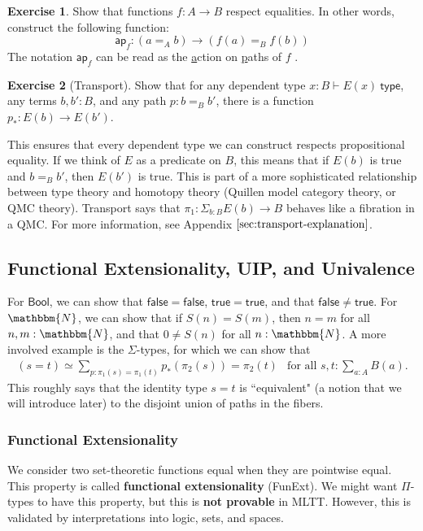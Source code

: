 \documentclass{amsart}
\theoremstyle{definition}
\newtheorem{ex}{Exercise}[section]
\newcommand{\N}{\mathbbm{N}}
\newcommand{\type}{\ensuremath{\mathsf{~type}}}
\newcommand{\Bool}{\ensuremath{\mathsf{Bool}}}
\newcommand{\True}{\ensuremath{\mathsf{true}}}
\newcommand{\False}{\ensuremath{\mathsf{false}}}
\renewcommand{\emph}{\textbf}
\begin{document}
\begin{ex}
    Show that functions $f : A \to B$ respect equalities.
    In other words, construct the following function:
    \[
        \mathsf{ap}_{f} : (a =_{A} b) \to (f(a) =_{B} f(b))
    \]
    The notation $\mathsf{ap}_{f}$ can be read as the \underline{a}ction on \underline{p}aths of $f$ \cite{hottbook}.
\end{ex}

%    

\begin{ex}[Transport]
    Show that for any dependent type $x : B \vdash E(x) \type $, any terms $b, b' : B$, and any path $p : b =_B b'$, there is a function $p_{*} : E(b) \to E(b')$.
\end{ex}
This ensures that every dependent type we can construct respects propositional equality. 
If we think of $E$ as a predicate on $B$, this means that if $E(b)$ is true and $b =_B b'$, then $E(b')$ is true.
This is part of a more sophisticated relationship between type theory and homotopy theory (Quillen model category theory, or QMC theory). 
Transport says that $\pi_{1} : \Sigma_{b : B} E(b) \rightarrow B$ behaves like a fibration in a QMC. For more information, see Appendix $\ref{sec:transport-explanation}$.

\subsection{Functional Extensionality, UIP, and Univalence}

For $\Bool$, we can show that $\False = \False$, $\True = \True$, and that $\False \neq \True$.
For $\N$, we can show that if $S(n) = S(m)$, then $n = m$ for all $n, m : \N$, and that $0 \neq S(n)$ for all $n : \N$.
A more involved example is the $\Sigma$-types, for which we can show that
\[
    \begin{array}{lr}
        (s = t) \simeq \sum_{p : \pi_{1}(s) = \pi_{1}(t)} p_{*}(\pi_{2}(s)) = \pi_{2}(t) & \text{for all } s, t : \sum_{a : A}B(a).
    \end{array}
\]
This roughly says that the identity type $s = t$ is ``equivalent" (a notion that we will introduce later) to the disjoint union of paths in the fibers.

\subsubsection{Functional Extensionality}\label{sec:functional-extensionality}
We consider two set-theoretic functions equal when they are pointwise equal.
This property is called \emph{functional extensionality} (FunExt).
We might want $\Pi$-types to have this property, but this is \textbf{not provable} in MLTT.
However, this is validated by interpretations into logic, sets, and spaces.
\end{document}
